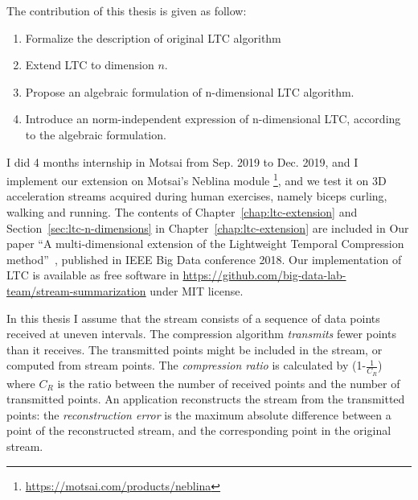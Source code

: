 
The contribution of this thesis is given as follow:
\begin{enumerate}
  \item Formalize the description of original LTC algorithm
  \item Extend LTC to dimension $n$.
  \item Propose an algebraic formulation of n-dimensional LTC algorithm.
  \item Introduce an norm-independent expression of n-dimensional LTC, according
  to the algebraic formulation.
\end{enumerate}


I did 4 months internship in Motsai from Sep. 2019 to Dec. 2019, and I implement
our extension on Motsai's Neblina module
\footnote{\url{https://motsai.com/products/neblina}}, and we test it on 3D
acceleration streams acquired during human exercises, namely biceps curling,
walking and running. The contents of Chapter~\ref{chap:ltc-extension} and
Section~\ref{sec:ltc-n-dimensions} in Chapter~\ref{chap:ltc-extension} are
included in Our paper ``A multi-dimensional extension of the Lightweight
Temporal Compression method''~\cite{li2018multi}, published in IEEE Big Data
conference 2018. Our implementation of LTC is available as free software in
\url{https://github.com/big-data-lab-team/stream-summarization} under MIT
license.



In this thesis I assume that the stream consists of a sequence of data points
received at uneven intervals. The compression algorithm \emph{transmits} fewer
points than it receives. The transmitted points might be included in the
stream, or computed from stream points. The \emph{compression ratio} is
calculated by (1-$\frac{1}{C_R}$) where $C_R$ is the ratio between the number of
received points and the number of transmitted points. An application
reconstructs the stream from the transmitted points: the \emph{reconstruction
error} is the maximum absolute difference between a point of the reconstructed
stream, and the corresponding point in the original stream.




